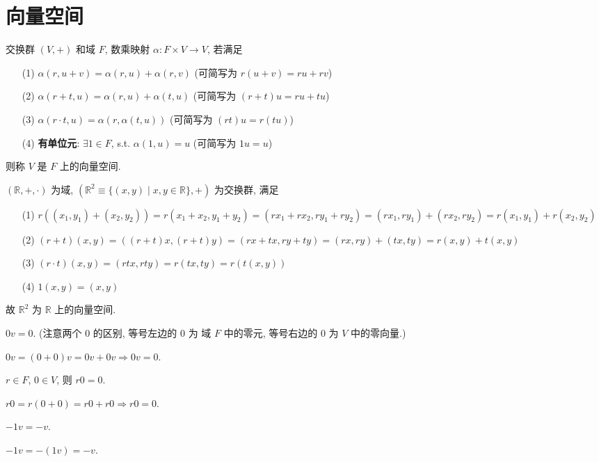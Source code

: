 \documentclass{note}
\begin{document}
\fi
\chapter{向量空间}
\begin{df}[向量空间]
    交换群 $(V,+)$ 和域 $F$, 数乘映射 $\alpha:F\times V\rightarrow V$, 若满足
    \begin{itemize}
        \item[(1)] $\alpha(r,u+v)=\alpha(r,u)+\alpha(r,v)$ (可简写为 $r(u+v)=ru+rv$)
        \item[(2)] $\alpha(r+t,u)=\alpha(r,u)+\alpha(t,u)$ (可简写为 $(r+t)u=ru+tu$)
        \item[(3)] $\alpha(r\cdot t,u)=\alpha(r,\alpha(t,u))$ (可简写为 $(rt)u=r(tu)$)
        \item[(4)] \textbf{有单位元}: $\exists 1\in F$, s.t. $\alpha(1,u)=u$ (可简写为 $1u=u$)
    \end{itemize}
    则称 $V$ 是 $F$ 上的向量空间.
\end{df}

\begin{eg}[直角坐标系]
    $(\mathbb{R},+,\cdot)$ 为域, $(\mathbb{R}^2\equiv\{(x,y)\mid x,y\in\mathbb{R}\},+)$ 为交换群, 满足
    \begin{itemize}
        \item[(1)] $r((x_1,y_1)+(x_2,y_2))=r(x_1+x_2,y_1+y_2)=(rx_1+rx_2,ry_1+ry_2)=(rx_1,ry_1)+(rx_2,ry_2)=r(x_1,y_1)+r(x_2,y_2)$
        \item[(2)] $(r+t)(x,y)=((r+t)x,(r+t)y)=(rx+tx,ry+ty)=(rx,ry)+(tx,ty)=r(x,y)+t(x,y)$
        \item[(3)] $(r\cdot t)(x,y)=(rtx,rty)=r(tx,ty)=r(t(x,y))$
        \item[(4)] $1(x,y)=(x,y)$
    \end{itemize}
    故 $\mathbb{R}^2$ 为 $\mathbb{R}$ 上的向量空间.
\end{eg}

$0v=0$. (注意两个 $0$ 的区别, 等号左边的 $0$ 为 域 $F$ 中的零元, 等号右边的 $0$ 为 $V$ 中的零向量.)
\begin{pf}
    $0v=(0+0)v=0v+0v\Longrightarrow 0v=0$.
\end{pf}

$r\in F$, $0\in V$, 则 $r0=0$.
\begin{pf}
    $r0=r(0+0)=r0+r0\Longrightarrow r0=0$.
\end{pf}

$-1v=-v$.
\begin{pf}
    $-1v=-(1v)=-v$.
\end{pf}
\end{document}
